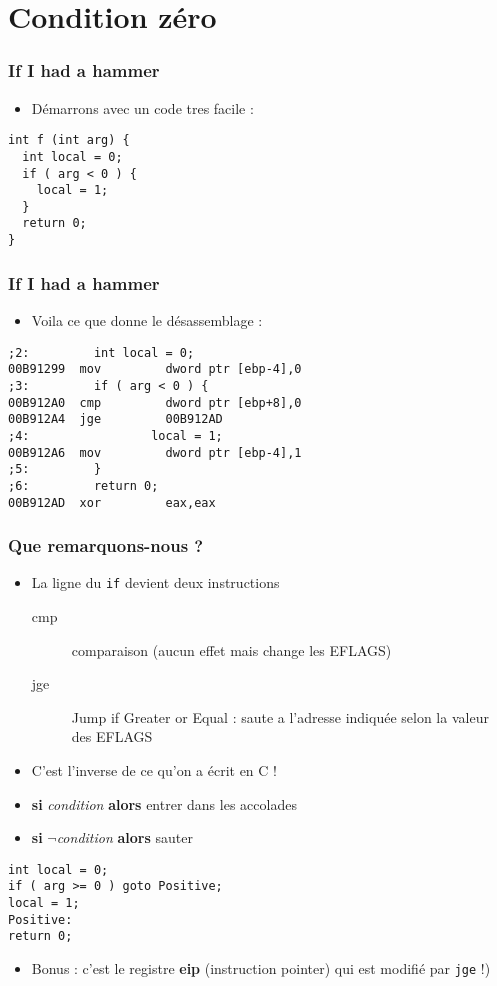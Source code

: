 \documentclass{beamer}
\begin{document}
\section{Condition zéro}
\begin{frame}[fragile]
\frametitle{If I had a hammer}
\begin{itemize}
\item Démarrons avec un code tres facile :
\end{itemize}
\begin{lstlisting}
int f (int arg) {
  int local = 0;
  if ( arg < 0 ) {
    local = 1;
  }
  return 0;
}
\end{lstlisting}
\end{frame}

\begin{frame}[fragile]
\frametitle{If I had a hammer}
\begin{itemize}
\item Voila ce que donne le désassemblage : 
\end{itemize}
\begin{lstlisting}[language={[x86masm]Assembler}]
;2:         int local = 0;
00B91299  mov         dword ptr [ebp-4],0  
;3:         if ( arg < 0 ) {
00B912A0  cmp         dword ptr [ebp+8],0  
00B912A4  jge         00B912AD  
;4:                 local = 1;
00B912A6  mov         dword ptr [ebp-4],1  
;5:         }
;6:         return 0;
00B912AD  xor         eax,eax  
\end{lstlisting}
\end{frame}

\begin{frame}[fragile]
\frametitle{Que remarquons-nous ?}
\begin{itemize}
\item La ligne du \lstinline+if+ devient deux instructions
\begin{description} 
\item[cmp] comparaison (aucun effet mais change les EFLAGS)
\item[jge] Jump if Greater or Equal  : saute a l'adresse indiquée selon la valeur des EFLAGS
\end{description} 
\pause
\item C'est l'inverse de ce qu'on a écrit en C !
\pause
\item \textbf{si} \textit{condition} \textbf{alors} entrer dans les accolades
\item \textbf{si} $\neg$\textit{condition} \textbf{alors} sauter 
\end{itemize}


\begin{lstlisting}
int local = 0;
if ( arg >= 0 ) goto Positive;
local = 1;
Positive:
return 0;
\end{lstlisting}
\pause
\begin{itemize}
\item Bonus : c'est le registre \textbf{eip} (instruction pointer) qui est modifié par \texttt{jge} !)
\end{itemize}
\end{frame}
\end{document}

